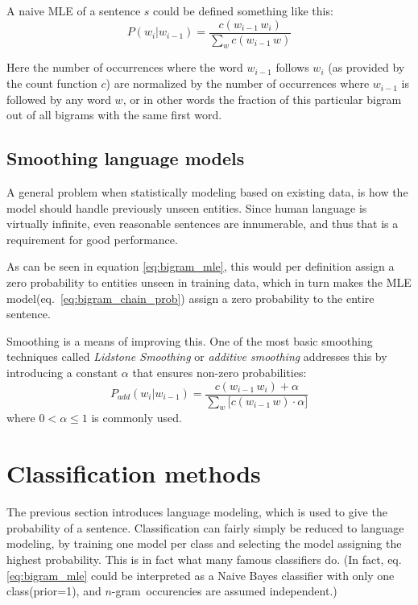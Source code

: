 \documentclass[a4paper,11pt]{kth-mag}
\newcommand{\ngram}{$n$-gram}
\begin{document}
A naive \gls{MLE} of a sentence $s$ could be defined something like this:
\begin{equation} \label{eq:bigram_mle}
P(w_i|w_{i-1}) = \frac{c(w_{i-1}\,w_i)}{\sum_{w} c(w_{i-1}\, w)}
\end{equation}

Here the number of occurrences where the word $w_{i-1}$ follows $w_i$ (as provided by the count function $c$) are normalized by the number of occurrences where $w_{i-1}$ is followed by any word $w$, or in other words the fraction of this particular bigram out of all bigrams with the same first word.

\subsection{Smoothing language models}
A general problem when statistically modeling based on existing data, is how the model should handle previously unseen entities. Since human language is virtually infinite, even reasonable sentences are innumerable, and thus that is a requirement for good performance.

As can be seen in equation \ref{eq:bigram_mle}, this would per definition assign a zero probability to entities unseen in training data, which in turn makes the \gls{MLE} model(eq.~\ref{eq:bigram_chain_prob}) assign a zero probability to the entire sentence\cite{chen_goodman}.

Smoothing is a means of improving this. One of the most basic smoothing techniques called \emph{Lidstone Smoothing} or \emph{additive smoothing} addresses this by introducing a constant $\alpha$ that ensures non-zero probabilities\cite{chen_goodman}:
\begin{equation} \label{eq:additive_smoothing}
P_{add}(w_i|w_{i-1}) = \frac{c(w_{i-1}\,w_i)+\alpha}{\sum_{w} \big[c(w_{i-1}\, w)\cdot\alpha\big]}
\end{equation}
where $0 < \alpha \leq 1$ is commonly used.

\section{Classification methods}
The previous section introduces language modeling, which is used to give the probability of a sentence. Classification can fairly simply be reduced to language modeling, by training one model per class and selecting the model assigning the highest probability. This is in fact what many famous classifiers do. (In fact, eq. \ref {eq:bigram_mle} could be interpreted as a Naive Bayes classifier with only one class(prior=1), and \ngram~occurencies are assumed independent.)
\end{document}

